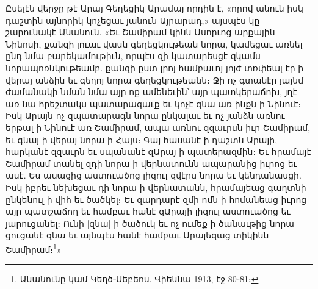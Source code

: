\documentclass{article}
\begin{document}
{Ըսելէն վերջը թէ Արայ Գեղեցիկ Արամայ որդին է, «որով անուն իսկ դաշտին այնորիկ կոչեցաւ յանուն Այրարադ,» այսպէս կը շարունակէ Անանուն. «Եւ Շամիրամ կինն Ասորւոց արքային Նինոսի, քանզի լուաւ վասն գեղեցկութեան նորա, կամեցաւ առնել ընդ նմա բարեկամութիւն, որպէս զի կատարեսցէ զկամս նորապոռնկութեամբ. քանզի ըստ լրոյ համբաւոյ յոյժ տռփեալ էր ի վերայ անձին եւ գեղոյ նորա գեղեցկութեանն։ Ջի ոչ գտանէր յայնմ ժամանակի նման նմա այր ոք ամենեւին՝ այր պատկերաճոխ, յղէ առ նա հրեշտակս պատարագաւք եւ կոչէ զնա առ ինքն ի Նինուէ։ Իսկ Արայն ոչ զպատարագն նորա ընկալաւ եւ ոչ յանձն առնու երթալ ի Նինուէ առ Շամիրամ, ապա առնու զզաւրսն իւր Շամիրամ, եւ գնայ ի վերայ նորա ի Հայս։ Գայ հասանէ ի դաշտն Արայի, հարկանէ զզաւրն եւ սպանանէ զԱրայ ի պատերազմին։ Եւ հրամայէ Շամիրամ տանել զդի նորա ի վերնատունն ապարանից իւրոց եւ ասէ. Ես ասացից աստուածոց լիզուլ զվէրս նորա եւ կենդանասցի. Իսկ իբրեւ նեխեցաւ դի նորա ի վերնատանն, հրամայեաց գաղտնի ընկենուլ ի վիհ եւ ծածկել։ Եւ զարդարէ զմի ոմն ի հոմանեաց իւրոց այր պատշաճող եւ համբաւ հանէ զԱրայի լիզուլ աստուածոց եւ յարուցանել։ Ունի [զնա] ի ծածուկ եւ ոչ ումեք ի ծանաւթից նորա ցուցանէ զնա եւ այնպէս հանէ համբաւ Արալեզաց տիկինն Շամիրամ։\footnote{Անանունը կամ Կեղծ֊Սեբեոս. Վիեննա 1913, էջ 80֊81։}»

}
\end{document}
